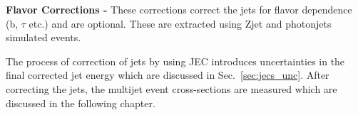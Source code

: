 {\bf Flavor Corrections -} These corrections correct the jets for flavor dependence (b, $\tau$ etc.) and are optional. These are extracted using Z\plusn jet and photon\plusn jets simulated events. %

The process of correction of jets by using JEC introduces uncertainties in the final corrected jet energy which are discussed in Sec.~\ref{sec:jecs_unc}. After correcting the jets, the multijet event cross-sections are measured which are discussed in the following chapter.
